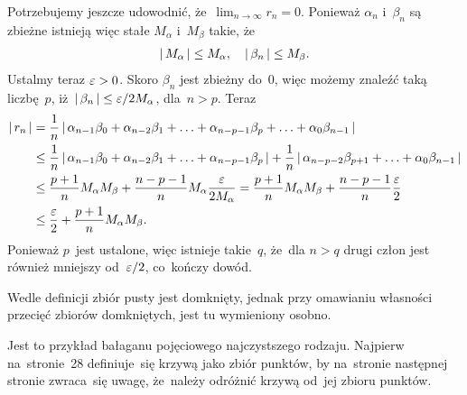 \documentclass[a4paper,11pt]{article}
\begin{document}
\vspace{\spaceFour}


\start {} Potrzebujemy jeszcze udowodnić,
że~$\lim_{ n \to \infty } r_{ n } = 0$. Ponieważ $\alpha_{ n }$
i~$\beta_{ n }$ są zbieżne istnieją więc stałe $M_{ \alpha }$ i~$M_{ \beta }$
takie, że
\begin{equation}
  \label{eq:Leja-28}
  \begin{split}
    \left| \,  M_{ \alpha }  \, \right| \leq M_{ \alpha }, \quad \left| \,  \beta_{ n }  \, \right| \leq
    M_{ \beta }.
  \end{split}
\end{equation}
Ustalmy teraz $\varepsilon > 0$. Skoro $\beta_{ n }$ jest zbieżny do~0, więc
możemy znaleźć taką liczbę~$p$,
iż~$\left| \,  \beta_{ n }  \, \right| \leq \varepsilon / 2 M_{ \alpha }$, dla~$n > p$. Teraz
\begin{equation}
  \label{eq:Leja-29}
  \begin{split}
    \left| \,  r_{ n }  \, \right| &= \frac{ 1 }{  n  } \left| \,  \alpha_{ n - 1 } \beta_{ 0 } +
      \alpha_{ n - 2 } \beta_{ 1 } + \ldots + \alpha_{ n - p - 1 } \beta_{ p } +
      \ldots
      + \alpha_{ 0 } \beta_{ n - 1 }  \, \right| \\
    &\leq \frac{ 1 }{  n  } \left| \,  \alpha_{ n - 1 } \beta_{ 0 } + \alpha_{ n - 2 }
      \beta_{ 1 } + \ldots + \alpha_{ n - p - 1 } \beta_{ p }  \, \right| + \frac{ 1 }{  n  }
    \left| \,  \alpha_{ n - p - 2 } \beta_{ p + 1 } + \ldots + \alpha_{ 0 } \beta_{ n - 1 }  \, \right| \\
    &\leq \frac{ p + 1 }{ n } M_{ \alpha } M_{ \beta } + \frac{ n - p - 1 }{ n
    } M_{ \alpha } \frac{ \varepsilon }{ 2 M_{ \alpha } } = \frac{ p + 1 }{ n } M_{
      \alpha } M_{ \beta } + \frac{ n - p - 1 }{ n }
    \frac{ \varepsilon }{ 2 } \\
    &\leq \frac{ \varepsilon }{ 2 } + \frac{ p + 1 }{ n } M_{ \alpha } M_{ \beta }.
  \end{split}
\end{equation}
Ponieważ $p$~jest ustalone, więc istnieje takie~$q$, że~dla $n > q$
drugi człon jest również mniejszy od~$\varepsilon / 2$, co~kończy dowód.

\vspace{\spaceFour}


\start {} Wedle definicji zbiór pusty jest domknięty, jednak
przy omawianiu własności przecięć zbiorów domkniętych, jest tu
wymieniony osobno.

\vspace{\spaceFour}


\start {} Jest to przykład bałaganu pojęciowego
najczystszego rodzaju. Najpierw na~stronie~28 definiuje~się krzywą
jako zbiór punktów, by na~stronie następnej stronie zwraca~się uwagę,
że~należy odróżnić krzywą od~jej zbioru punktów.
\end{document}
